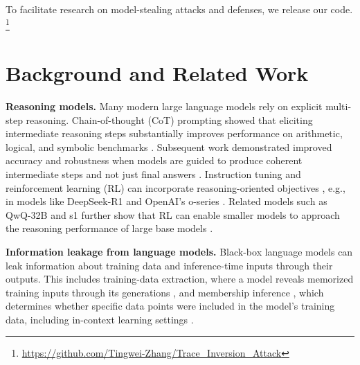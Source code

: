 \documentclass{article}
\begin{document}

To facilitate research on model-stealing attacks and defenses, we release our code. \footnote{\url{https://github.com/Tingwei-Zhang/Trace_Inversion_Attack}}


\section{Background and Related Work}

\textbf{Reasoning models.}
Many modern large language models rely on explicit multi-step reasoning.  Chain-of-thought (CoT) prompting showed that eliciting intermediate reasoning steps substantially improves performance on arithmetic, logical, and symbolic benchmarks \citep{wei2022chain,kojima2022large}.  Subsequent work demonstrated improved accuracy and robustness when models are guided to produce coherent intermediate steps and not just final answers \citep{wang2022self}.
Instruction tuning and reinforcement learning (RL) can incorporate reasoning-oriented objectives \citep{ouyang2022training,bai2022training}, e.g., in models like DeepSeek-R1 \citep{guo2025deepseek} and OpenAI’s o-series \citep{openai_o1_system_card}.  Related models such as QwQ-32B and s1 further show that RL can enable smaller models to approach the reasoning performance of large base models \citep{qwen2024qwq,muennighoff2025s1}.

\textbf{Information leakage from language models.}
Black-box language models can leak information about training data and inference-time inputs through their outputs.  This includes training-data extraction, where a model reveals memorized training inputs through its generations \citep{carlini2021extracting}, and membership inference \citep{shokri2017membership}, which determines whether specific data points were included in the model's training data, including in-context learning settings \citep{mattern2023membership,wen2024membership}. 
\end{document}
